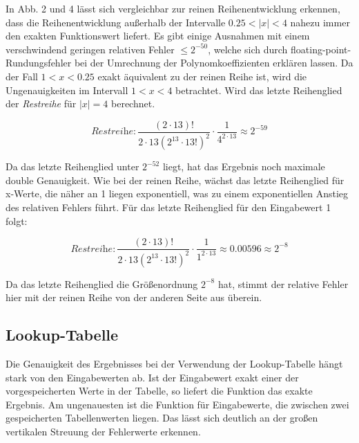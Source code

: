 \documentclass[course=erap] {aspdoc}
\begin{document}
    In Abb. 2 und 4 lässt sich vergleichbar zur reinen Reihenentwicklung erkennen, dass die Reihenentwicklung außerhalb der Intervalle $0.25<|x|<4$ nahezu immer den exakten Funktionswert liefert.
    Es gibt einige Ausnahmen mit einem verschwindend geringen relativen Fehler $\leq2^{-50}$, welche sich durch floating-point-Rundungsfehler bei der Umrechnung der Polynomkoeffizienten erklären lassen.
    Da der Fall $1<x<0.25$ exakt äquivalent zu der reinen Reihe ist, wird die Ungenauigkeiten im Intervall $1<x<4$ betrachtet.
    Wird das letzte Reihenglied der \textit{Restreihe} für $|x|=4$ berechnet.

    \[
        \textit{Restreihe}: \frac{(2\cdot13)!}{2\cdot13(2^{13}\cdot 13!)^2} \cdot \frac{1}{4^{2\cdot13}} \approx 2^{-59}
    \]

    Da das letzte Reihenglied unter $2^{-52}$ liegt, hat das Ergebnis noch maximale double Genauigkeit.
    Wie bei der reinen Reihe, wächst das letzte Reihenglied für x-Werte, die näher an 1 liegen exponentiell, was zu einem exponentiellen Anstieg des relativen Fehlers führt.
    Für das letzte Reihenglied für den Eingabewert 1 folgt:

    \[
        \textit{Restreihe}: \frac{(2\cdot13)!}{2\cdot13(2^{13}\cdot 13!)^2} \cdot \frac{1}{1^{2\cdot13}} \approx 0.00596 \approx 2^{-8}
    \]

    Da das letzte Reihenglied die Größenordnung $2^{-8}$ hat, stimmt der relative Fehler hier mit der reinen Reihe von der anderen Seite aus überein.

    \subsection{Lookup-Tabelle}\label{subsec:lookup-tabelle}

    Die Genauigkeit des Ergebnisses bei der Verwendung der Lookup-Tabelle hängt stark von den Eingabewerten ab.
    Ist der Eingabewert exakt einer der vorgespeicherten Werte in der Tabelle, so liefert die Funktion das exakte Ergebnis.
    Am ungenauesten ist die Funktion für Eingabewerte, die zwischen zwei gespeicherten Tabellenwerten liegen.
    Das lässt sich deutlich an der großen vertikalen Streuung der Fehlerwerte erkennen.
\end{document}
